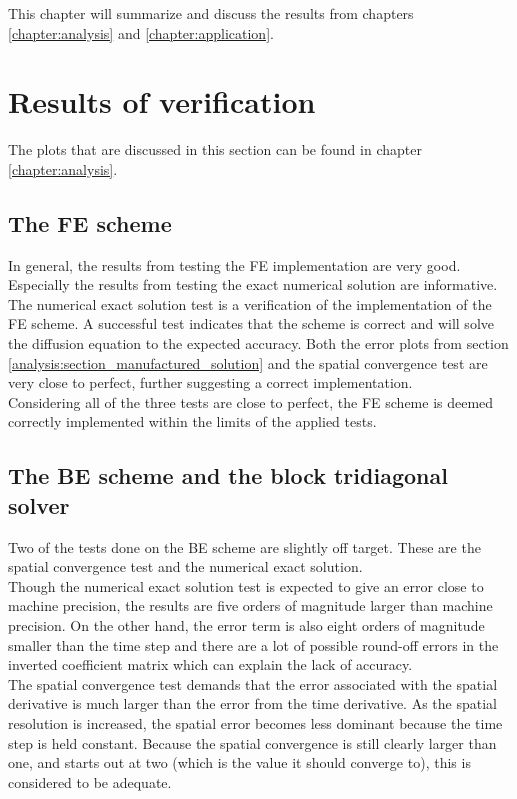 \noindent This chapter will summarize and discuss the results from chapters \ref{chapter:analysis} and \ref{chapter:application}.

\section{Results of verification}
The plots that are discussed in this section can be found in chapter \ref{chapter:analysis}.

\subsection{The FE scheme}
In general, the results from testing the FE implementation are very good. Especially the results from testing the exact numerical solution are informative. 
The numerical exact solution test is a verification of the implementation of the FE scheme. 
A successful test indicates that the scheme is correct and will solve the diffusion equation to the expected accuracy. 
Both the error plots from section \ref{analysis:section_manufactured_solution} and the spatial convergence test are very close to perfect, further suggesting a correct implementation. \\
Considering all of the three tests are close to perfect, the FE scheme is deemed correctly implemented within the limits of the applied tests.

\subsection{The BE scheme and the block tridiagonal solver}
Two of the tests done on the BE scheme are slightly off target. 
These are the spatial convergence test and the numerical exact solution. \\
Though the numerical exact solution test is expected to give an error close to machine precision, the results are five orders of magnitude larger than machine precision. 
On the other hand, the error term is also eight orders of magnitude smaller than the time step and there are a lot of possible round-off errors in the inverted coefficient matrix which can explain the lack of accuracy. \\
The spatial convergence test demands that the error associated with the spatial derivative is much larger than the error from the time derivative. 
As the spatial resolution is increased, the spatial error becomes less dominant because the time step is held constant. 
Because the spatial convergence is still clearly larger than one, and starts out at two (which is the value it should converge to), this is considered to be adequate. \\

